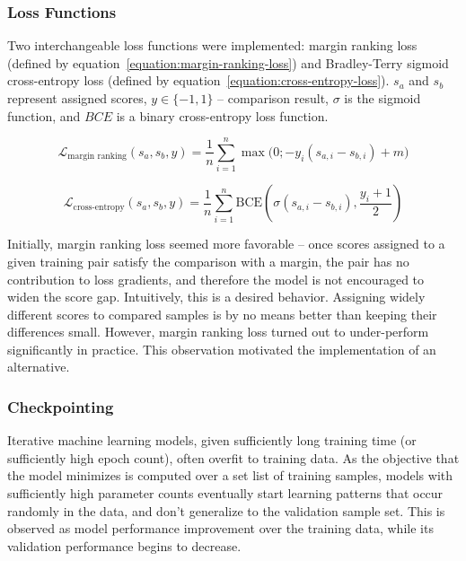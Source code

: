 \documentclass[a4paper,11pt,twoside]{report}
\theoremstyle{definition}
\begin{document}
\subsubsection{Loss Functions}

Two interchangeable loss functions were implemented: margin ranking loss (defined by equation~\ref{equation:margin-ranking-loss}) and Bradley-Terry sigmoid cross-entropy loss (defined by equation~\ref{equation:cross-entropy-loss}). $s_a$ and $s_b$ represent assigned scores, $y \in \{-1, 1\}$ -- comparison result, $\sigma$ is the sigmoid function, and $BCE$ is a binary cross-entropy loss function.

\begin{equation}
\label{equation:margin-ranking-loss}
    \mathcal{L}_\text{margin ranking}(s_a, s_b, y) = \frac{1}{n}\sum_{i=1}^{n} \max\bigl(0;-y_i(s_{a,i}-s_{b,i}) + m\bigr) 
\end{equation}

\begin{equation}
\label{equation:cross-entropy-loss}
    \mathcal{L}_\text{cross-entropy}(s_a, s_b, y) = \frac{1}{n}\sum_{i=1}^{n} \text{BCE}\left(\sigma(s_{a,i}-s_{b,i}), \frac{y_i+1}{2}\right)
\end{equation}

Initially, margin ranking loss seemed more favorable -- once scores assigned to a given training pair satisfy the comparison with a margin, the pair has no contribution to loss gradients, and therefore the model is not encouraged to widen the score gap. Intuitively, this is a desired behavior. Assigning widely different scores to compared samples is by no means better than keeping their differences small. However, margin ranking loss turned out to under-perform significantly in practice. This observation motivated the implementation of an alternative.

\subsubsection{Checkpointing}

Iterative machine learning models, given sufficiently long training time (or sufficiently high epoch count), often overfit to training data. As the objective that the model minimizes is computed over a set list of training samples, models with sufficiently high parameter counts eventually start learning patterns that occur randomly in the data, and don't generalize to the validation sample set. This is observed as model performance improvement over the training data, while its validation performance begins to decrease.
\end{document}
